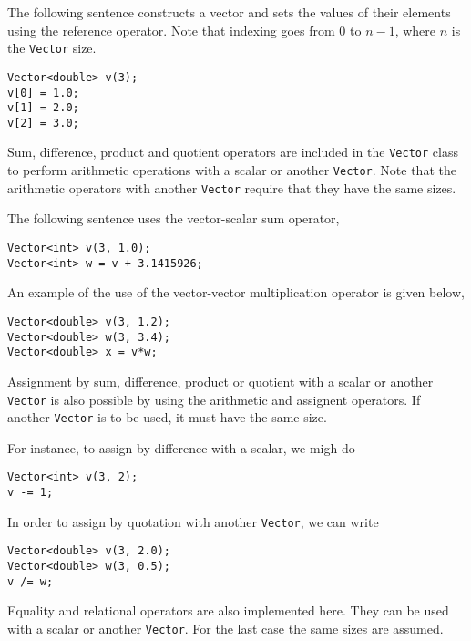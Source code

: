 The following sentence constructs a vector and sets the values of their elements using the reference operator. Note
that indexing goes from $0$ to $n-1$, where $n$ is the
\lstinline"Vector" size.

\begin{lstlisting}
Vector<double> v(3);
v[0] = 1.0;
v[1] = 2.0;
v[2] = 3.0;
\end{lstlisting}


Sum, difference, product and quotient operators are included in the \lstinline"Vector" class to perform arithmetic operations with a scalar or another \lstinline"Vector". Note that the arithmetic operators with another \lstinline"Vector" require that they have the same sizes. 

The following sentence uses the vector-scalar sum operator, 

\begin{lstlisting}
Vector<int> v(3, 1.0);
Vector<int> w = v + 3.1415926;
\end{lstlisting}

An example of the use of the vector-vector multiplication operator is given below, 

\begin{lstlisting}
Vector<double> v(3, 1.2);
Vector<double> w(3, 3.4);
Vector<double> x = v*w;
\end{lstlisting}


Assignment by sum, difference, product or quotient with a scalar or another \lstinline"Vector" is also possible by using the arithmetic and assignent operators. If another \lstinline"Vector" is to be used, it must have the same size.

For instance, to assign by difference with a scalar, we migh do

\begin{lstlisting}
Vector<int> v(3, 2);
v -= 1;
\end{lstlisting}
 
In order to assign by quotation with another \lstinline"Vector", we can write 

\begin{lstlisting}
Vector<double> v(3, 2.0);
Vector<double> w(3, 0.5);
v /= w;
\end{lstlisting}


Equality and relational operators are also implemented here. They can be used with a scalar or another \lstinline"Vector". For the last case the same sizes are assumed. 

